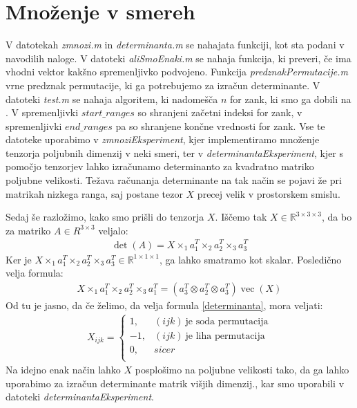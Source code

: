 \documentclass[a4paper,12pt]{article}
\def\R{\mathbb{R}} %
\DeclareMathOperator{\ve}{vec}
\begin{document}
\section{Množenje v smereh}
V datotekah \emph{zmnozi.m} in \emph{determinanta.m} se nahajata funkciji, kot sta podani v navodilih naloge. V datoteki \emph{aliSmoEnaki.m} se nahaja funkcija, ki preveri, če ima vhodni vektor kakšno spremenljivko podvojeno. Funkcija \emph{predznakPermutacije.m} vrne predznak permutacije, ki ga potrebujemo za izračun determinante. V datoteki \emph{test.m} se nahaja algoritem, ki nadomešča $n$ for zank, ki smo ga dobili na \cite{vir1}. V spremenljivki $start\_ranges$ so shranjeni začetni indeksi for zank,  v spremenljivki $end\_ranges$ pa so shranjene končne vrednosti for zank. Vse te datoteke uporabimo v \emph{zmnoziEksperiment}, kjer implementiramo množenje tenzorja poljubnih dimenzij v neki smeri, ter v \emph{determinantaEksperiment}, kjer s pomočjo tenzorjev lahko izračunamo determinanto za kvadratno matriko poljubne velikosti. Težava računanja determinante na tak način se pojavi že pri matrikah nizkega ranga, saj postane tezor $X$ precej velik v prostorskem smislu. 

Sedaj še razložimo, kako smo prišli do tenzorja $X$. 
Iščemo tak $X\in \R^{3\times3\times3}$, da bo za matriko $A \in R^{3\times 3}$ veljalo:
\begin{align}
\label{determinanta}
	\det(A) = X \times_1 a_1^T \times_2 a_2^T \times_3 a_3^T
\end{align}
Ker je $X \times_1 a_1^T \times_2 a_2^T \times_3 a_3^T \in \R^{1\times1\times1}$, ga lahko smatramo kot skalar. Posledično velja formula: 
\begin{align*}
	X \times_1 a_1^T \times_2 a_2^T \times_3 a_1^T = (a_3^T\otimes a_2^T\otimes a_3^T)\ve(X)
\end{align*}
Od tu je jasno, da če želimo, da velja formula \eqref{determinanta}, mora veljati:
\begin{align*}
	X_{ijk} = \begin{cases}
	1 , &(i j k) ~\text{je soda permutacija}  \\
	-1, &(i j k) ~\text{je liha permutacija}  \\
	0, &sicer\\
	\end{cases}
\end{align*}
Na idejno enak način lahko $X$ posplošimo na poljubne velikosti tako, da ga lahko uporabimo za izračun determinante matrik višjih dimenzij., kar smo uporabili v datoteki \emph{determinantaEksperiment}.  
\end{document}
